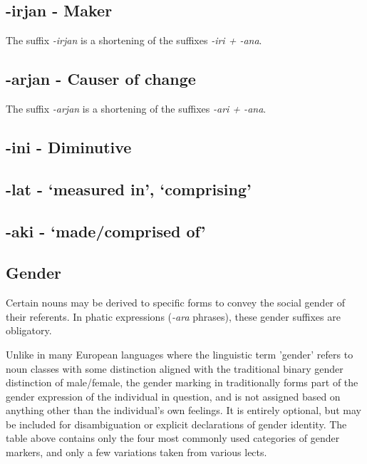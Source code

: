 \subsection{-irjan - Maker}

The suffix \textit{-irjan} is a shortening of the suffixes \textit{-iri + -ana}. 

\subsection{-arjan - Causer of change}

The suffix \textit{-arjan} is a shortening of the suffixes \textit{-ari + -ana}. 

\subsection{-ini - Diminutive}

\subsection{-lat - `measured in', `comprising'}

\subsection{-aki - `made/comprised of'}

\subsection{Gender}
Certain nouns may be derived to specific forms to convey the social gender of their referents. In phatic expressions (\emph{-ara} phrases), these gender suffixes are obligatory.


Unlike in many European languages where the linguistic term 'gender' refers to noun classes with some distinction aligned with the traditional binary gender distinction of male/female, the gender marking in \lang{} traditionally forms part of the gender expression of the individual in question, and is not assigned based on anything other than the individual's own feelings. It is entirely optional, but may be included for disambiguation or explicit declarations of gender identity. The table above contains only the four most commonly used categories of gender markers, and only a few variations taken from various lects.

